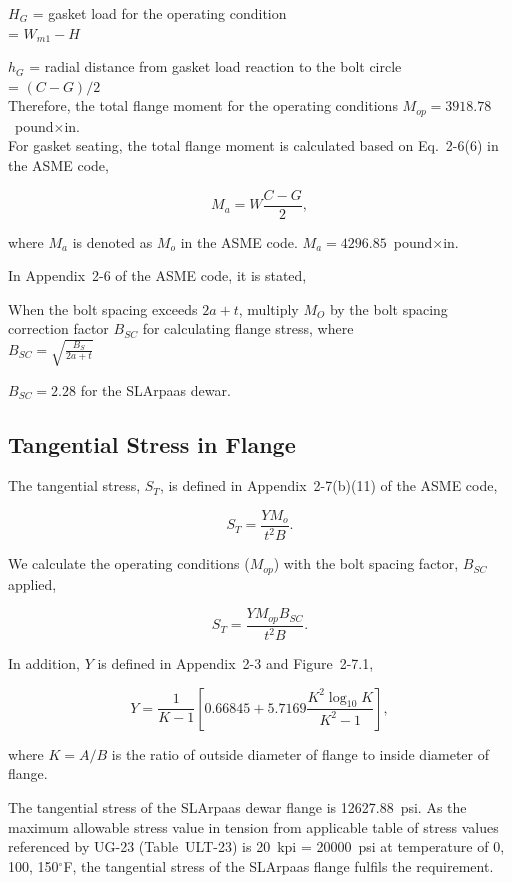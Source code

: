 $H_G$ = gasket load for the operating condition \\
= $W_{m1} - H$

$h_G$ = radial distance from gasket load reaction to the bolt circle \\
= $(C-G)/2$ \\

Therefore, the total flange moment for the operating conditions
$M_{op} = 3918.78$~pound$\times$in.\\

For gasket seating, the total flange moment is calculated based on
Eq.~2-6(6) in the ASME code,

\begin{equation}
    M_a = W\frac{C-G}{2},
\end{equation}

where $M_a$ is denoted as $M_o$ in the ASME code.
$M_a = 4296.85$~pound$\times$in.

In Appendix~2-6 of the ASME code, it is stated,

\begin{displayquote}
    When the bolt spacing exceeds $2a + t$, multiply $M_O$ by the bolt spacing 
    correction factor $B_{SC}$ for calculating flange stress, where \\

    $B_{SC} = \sqrt{\frac{B_S}{2a+t}}$
\end{displayquote}

$B_{SC} = 2.28$ for the SLArpaas dewar.

\subsection{Tangential Stress in Flange}
\label{app:tangential_stress}

The tangential stress, $S_T$, is defined in Appendix~2-7(b)(11) of the
ASME code,

\begin{equation}
    S_T = \frac{YM_o}{t^2B}.
\end{equation}


We calculate the operating conditions ($M_{op}$) with the bolt spacing 
factor, $B_{SC}$ applied,

\begin{equation}
    S_T = \frac{YM_{op}B_{SC}}{t^2B}.
\end{equation}

In addition, $Y$ is defined in Appendix~2-3 and Figure~2-7.1,

\begin{equation}
    Y = \frac{1}{K-1}[0.66845+5.7169\frac{K^2\log_{10}K}{K^2-1}],
\end{equation}

where $K = A/B$ is the ratio of outside diameter of flange to 
inside diameter of flange.

The tangential stress of the SLArpaas dewar flange is 12627.88~psi.
As the maximum allowable stress value in tension from applicable table
of stress values referenced by UG-23 (Table~ULT-23)
is 20~kpi = 20000~psi at temperature of 0, 100, 150$^{\circ}$F,
the tangential stress of the SLArpaas flange fulfils the requirement.
